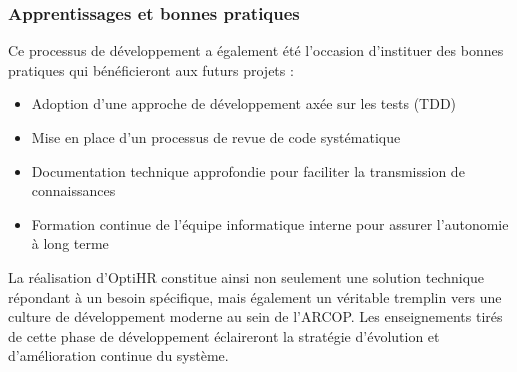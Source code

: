 \subsubsection{Apprentissages et bonnes pratiques}

Ce processus de développement a également été l'occasion d'instituer des bonnes pratiques qui bénéficieront aux futurs projets :

\begin{itemize}
    \item Adoption d'une approche de développement axée sur les tests (TDD)
    \item Mise en place d'un processus de revue de code systématique
    \item Documentation technique approfondie pour faciliter la transmission de connaissances
    \item Formation continue de l'équipe informatique interne pour assurer l'autonomie à long terme
\end{itemize}

La réalisation d'OptiHR constitue ainsi non seulement une solution technique répondant à un besoin spécifique, mais également un véritable tremplin vers une culture de développement moderne au sein de l'ARCOP. Les enseignements tirés de cette phase de développement éclaireront la stratégie d'évolution et d'amélioration continue du système.
\clearpage